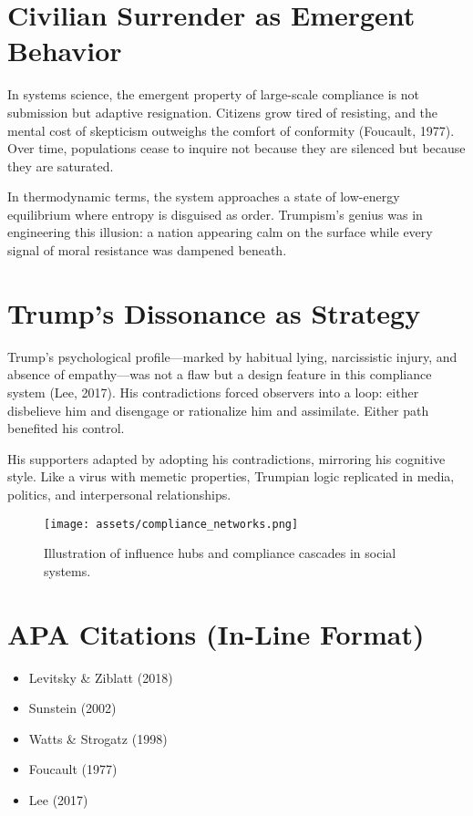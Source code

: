 \section*{Civilian Surrender as Emergent Behavior}

In systems science, the emergent property of large-scale compliance is
not submission but adaptive resignation. Citizens grow tired of
resisting, and the mental cost of skepticism outweighs the comfort of
conformity (Foucault, 1977). Over time, populations cease to inquire not
because they are silenced but because they are saturated.

In thermodynamic terms, the system approaches a state of low-energy
equilibrium where entropy is disguised as order. Trumpism's genius was
in engineering this illusion: a nation appearing calm on the surface
while every signal of moral resistance was dampened beneath.

\section*{Trump’s Dissonance as Strategy}

Trump's psychological profile---marked by habitual lying, narcissistic
injury, and absence of empathy---was not a flaw but a design feature in
this compliance system (Lee, 2017). His contradictions forced observers
into a loop: either disbelieve him and disengage or rationalize him and
assimilate. Either path benefited his control.

His supporters adapted by adopting his contradictions, mirroring his
cognitive style. Like a virus with memetic properties, Trumpian logic
replicated in media, politics, and interpersonal relationships.

\begin{figure}[H]
\centering
\texttt{[image: assets/compliance\_networks.png]}
\caption{Illustration of influence hubs and compliance cascades in social systems.}
\label{fig:compliance_networks}
\end{figure}

\section*{APA Citations (In-Line Format)}

\begin{itemize}
\tightlist
\item
  Levitsky \& Ziblatt (2018)\\
\item
  Sunstein (2002)\\
\item
  Watts \& Strogatz (1998)\\
\item
  Foucault (1977)\\
\item
  Lee (2017)
\end{itemize}

